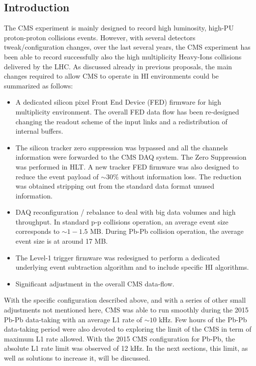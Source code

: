 \subsection{Introduction\label{subsec:HWintro}}
The CMS experiment is mainly designed to record high luminosity, high-PU proton-proton collisions events.  However, with several detectors tweak/configuration changes, over the last several years, the CMS experiment has been able to record successfully also the high multiplicity Heavy-Ions collisions delivered by the LHC. As discussed already in previous
proposals, the main changes required to allow CMS to operate in HI environments could be summarized as follows:

\begin{itemize}
\item A dedicated silicon pixel Front End Device (FED) firmware for high multiplicity environment. The overall FED data flow has been re-designed changing the readout scheme of the input links and a redistribution of internal buffers.
 
\item The silicon tracker zero suppression was bypassed and all the channels information were forwarded to the CMS DAQ system. The Zero Suppression was performed in HLT. A new tracker FED firmware was also designed to reduce the event payload of $\sim 30 \%$ without information loss. The reduction was obtained stripping out from the standard data format unused information.  

\item DAQ reconfiguration / rebalance to deal with big data volumes and high throughput. In standard p-p collisions operation, an average event size corresponds to $\sim 1-1.5$ MB. During Pb-Pb collision operation, the average event size is at around 17 MB. 

\item The Level-1 trigger firmware was redesigned to perform a dedicated underlying event subtraction algorithm and to include specific HI algorithms.

\item Significant adjustment in the overall CMS data-flow.
\end{itemize}


With the specific configuration described above, and with a series of other small adjustments not mentioned here, CMS was able to run smoothly during the 2015 Pb-Pb data-taking with an average L1 rate of $\sim 10$ kHz. Few hours of the Pb-Pb data-taking
period were also devoted to exploring the limit of the CMS in term of maximum L1 rate allowed.  With the 2015 CMS configuration for Pb-Pb, the absolute L1 rate limit was observed of 12 kHz. In the next sections, this limit, as well as solutions to increase it, will be discussed. 

